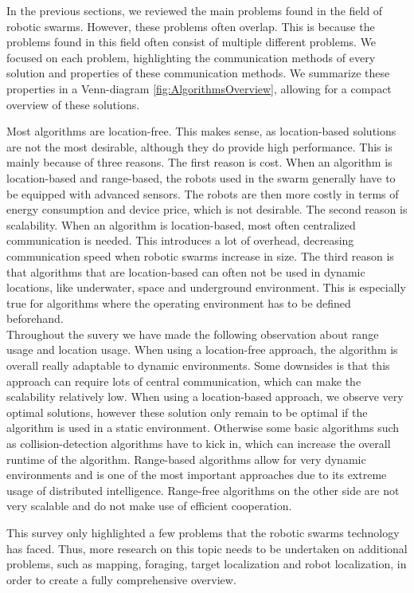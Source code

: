 
In the previous sections, we reviewed the main problems found in the field of robotic swarms. 
However, these problems often overlap.
This is because the problems found in this field often consist of multiple different problems. 
We focused on each problem, highlighting the communication methods of every solution and properties of these communication methods. 
We summarize these properties in a Venn-diagram \ref{fig:AlgorithmsOverview}, allowing for a compact overview of these solutions. 



Most algorithms are location-free.
This makes sense, as location-based solutions are not the most desirable, although they do provide high performance.
This is mainly because of three reasons. 
The first reason is cost. 
When an algorithm is location-based and range-based, the robots used in the swarm generally have to be equipped with advanced sensors. 
The robots are then more costly in terms of energy consumption and device price, which is not desirable.
The second reason is scalability. 
When an algorithm is location-based, most often centralized communication is needed. 
This introduces a lot of overhead, decreasing communication speed when robotic swarms increase in size. 
The third reason is that algorithms that are location-based can often not be used in dynamic locations, like underwater, space and underground environment.
This is especially true for algorithms where the operating environment has to be defined beforehand.\\

Throughout the suvery we have made the following observation about range usage and location usage. When using a location-free approach, the algorithm is overall really adaptable to dynamic environments. Some downsides is that this approach can require lots of central communication, which can make the scalability relatively low. When using a location-based approach, we observe very optimal solutions, however these solution only remain to be optimal if the algorithm is used in a static environment. Otherwise some basic algorithms such as collision-detection algorithms have to kick in, which can increase the overall runtime of the algorithm. Range-based algorithms allow for very dynamic environments and is one of the most important approaches due to its extreme usage of distributed intelligence. Range-free algorithms on the other side are not very scalable and do not make use of efficient cooperation.

This survey only highlighted a few problems that the robotic swarms technology has faced. 
Thus, more research on this topic needs to be undertaken on additional problems, such as mapping, foraging, target localization and robot localization, in order to create a fully comprehensive overview.

